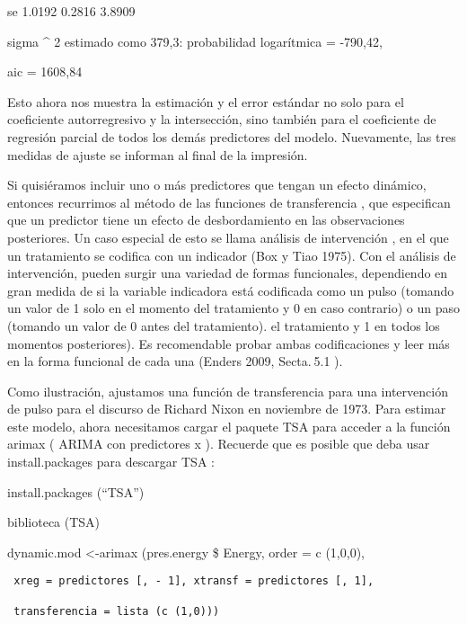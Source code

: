 \documentclass[
]{book}
\begin{document}
se 1.0192 0.2816 3.8909

sigma \^{} 2 estimado como 379,3: probabilidad logarítmica = -790,42,

aic = 1608,84

Esto ahora nos muestra la estimación y el error estándar no solo para el coeficiente autorregresivo y la intersección, sino también para el coeficiente de regresión parcial de todos los demás predictores del modelo. Nuevamente, las tres medidas de ajuste se informan al final de la impresión.

Si quisiéramos incluir uno o más predictores que tengan un efecto dinámico, entonces recurrimos al método de las funciones de transferencia , que especifican que un predictor tiene un efecto de desbordamiento en las observaciones posteriores. Un caso especial de esto se llama análisis de intervención , en el que un tratamiento se codifica con un indicador (Box y Tiao 1975). Con el análisis de intervención, pueden surgir una variedad de formas funcionales, dependiendo en gran medida de si la variable indicadora está codificada como un pulso (tomando un valor de 1 solo en el momento del tratamiento y 0 en caso contrario) o un paso (tomando un valor de 0 antes del tratamiento). el tratamiento y 1 en todos los momentos posteriores). Es recomendable probar ambas codificaciones y leer más en la forma funcional de cada una (Enders 2009, Secta. 5.1 ).

Como ilustración, ajustamos una función de transferencia para una intervención de pulso para el discurso de Richard Nixon en noviembre de 1973. Para estimar este modelo, ahora necesitamos cargar el paquete TSA para acceder a la función arimax ( ARIMA con predictores x ). Recuerde que es posible que deba usar install.packages para descargar TSA :

install.packages (``TSA'')

biblioteca (TSA)

dynamic.mod \textless-arimax (pres.energy \$ Energy, order = c (1,0,0),

\begin{verbatim}
 xreg = predictores [, - 1], xtransf = predictores [, 1],

 transferencia = lista (c (1,0)))
\end{verbatim}
\end{document}
